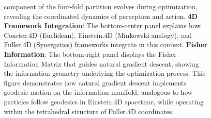 \documentclass[
  10pt,
]{article}
\begin{document}
\begin{figure}
{component of the four-fold partition evolves during optimization,
revealing the coordinated dynamics of perception and action. \textbf{4D
Framework Integration}: The bottom-center panel explains how Coxeter.4D
(Euclidean), Einstein.4D (Minkowski analogy), and Fuller.4D
(Synergetics) frameworks integrate in this context. \textbf{Fisher
Information}: The bottom-right panel displays the Fisher Information
Matrix that guides natural gradient descent, showing the information
geometry underlying the optimization process. This figure demonstrates
how natural gradient descent implements geodesic motion on the
information manifold, analogous to how particles follow geodesics in
Einstein.4D spacetime, while operating within the tetrahedral structure
of Fuller.4D coordinates.}
\end{figure}
\end{document}
